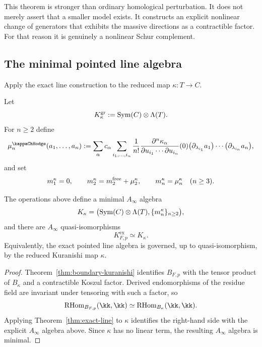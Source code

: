 \begin{remark}
This theorem is stronger than ordinary homological perturbation. It does not merely assert that a smaller model exists. It constructs an explicit nonlinear change of generators that exhibits the massive directions as a contractible factor. For that reason it is genuinely a nonlinear Schur complement.
\end{remark}

\subsection{The minimal pointed line algebra}

Apply the exact line construction to the reduced map $\kappa:T\to C$.

Let
\[
K_\kappa^{\operatorname{gr}}:=\operatorname{Sym}(C)\otimes \Lambda(T).
\]
For $n\ge 2$ define
\begin{equation}%
\mu_n^\kappaChHodge(a_1,\dots,a_n)
:=
\sum_{\alpha}
c_\alpha
\sum_{i_1,\dots,i_n}
\frac{1}{n!}
\frac{\partial^n\kappa_\alpha}{\partial u_{i_1}\cdots \partial u_{i_n}}(0)
\bigl(\partial_{\lambda_{i_1}}a_1\bigr)\cdots \bigl(\partial_{\lambda_{i_n}}a_n\bigr),
\end{equation}
and set
\[
m_1^\kappa=0,
\qquad
m_2^\kappa=m_2^{\mathrm{free}}+\mu_2^\kappa,
\qquad
m_n^\kappa=\mu_n^\kappa\quad (n\ge 3).
\]

\begin{theorem}%
The operations above define a minimal $A_\infty$ algebra
\[
K_\kappa
=
\bigl(\operatorname{Sym}(C)\otimes \Lambda(T),\{m_n^\kappa\}_{n\ge 2}\bigr),
\]
and there are $A_\infty$ quasi-isomorphisms
\[
K_{F,p}^{\mathrm{ex}}
\simeq
K_\kappa.
\]
Equivalently, the exact pointed line algebra is governed, up to quasi-isomorphism, by the reduced Kuranishi map $\kappa$.
\end{theorem}

\begin{proof}
Theorem~\ref{thm:boundary-kuranishi} identifies $B_{F,p}$ with the tensor product of $B_\kappa$ and a contractible Koszul factor. Derived endomorphisms of the residue field are invariant under tensoring with such a factor, so
\[
\RHom_{B_{F,p}}(\kk,\kk)\simeq \RHom_{B_\kappa}(\kk,\kk).
\]
Applying Theorem~\ref{thm:exact-line} to $\kappa$ identifies the right-hand side with the explicit $A_\infty$ algebra above. Since $\kappa$ has no linear term, the resulting $A_\infty$ algebra is minimal.
\end{proof}

